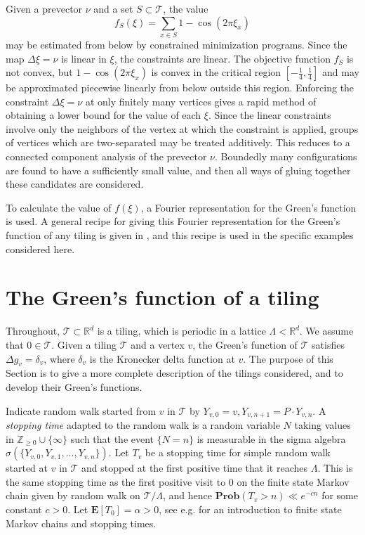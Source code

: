 \documentclass[a4paper, 12pt, notitlepage]{amsart}
\newcommand{\bR}{\mathbb{R}}
\newcommand{\zed}{\mathbb{Z}}
\newcommand{\E}{\mathbf{E}}
\newcommand{\Prob}{\mathbf{Prob}}
\newcommand{\sT}{\mathscr{T}}
\theoremstyle{remark}
\begin{document}
Given a prevector $\nu$ and a set $S\subset \sT$, the value
\[
 f_S(\xi) = \sum_{x \in S}1-\cos(2\pi \xi_x)
\]
may be estimated from below by constrained minimization programs.  Since the map $\Delta \xi = \nu$ is linear in $\xi$, the constraints are linear.  The objective function $f_S$ is not convex, but $1 - \cos(2\pi \xi_x)$ is convex in the critical region $\left[-\frac{1}{4}, \frac{1}{4}\right]$ and may be approximated piecewise linearly from below outside this region.  Enforcing the constraint $\Delta \xi = \nu$ at only finitely many vertices gives a rapid method of obtaining a lower bound for the value of each $\xi$.  Since the linear constraints involve only the neighbors of the vertex at which the constraint is applied, groups of vertices which are two-separated may be treated additively.  This reduces to a connected component analysis of the prevector $\nu$.  Boundedly many configurations are found to have a sufficiently small value, and then all ways of gluing together these candidates are considered.

To calculate the value of $f(\xi)$, a Fourier representation for the Green's function is used.  A general recipe for giving this Fourier representation for the Green's function of any tiling is given in \cite{HS19}, and this recipe is used in the specific examples considered here.


\section{The Green's function of a tiling}\label{Greens_function_section} 
Throughout, $\sT \subset \bR^d$ is a tiling, which is periodic in a lattice $\Lambda < \bR^d$.  We assume that $0 \in \sT$.
Given a tiling $\sT$ and a vertex $v$, the Green's function of $\sT$ satisfies $\Delta g_v = \delta_v$, where $\delta_v$ is the Kronecker delta function at $v$.  The purpose of this Section is to give a more complete description of the tilings considered, and to develop their Green's functions. 



Indicate random walk started from $v$ in $\sT$ by
$Y_{v,0} = v, Y_{v,n+1} = P \cdot Y_{v,n}$. A \emph{stopping time} adapted to the random walk is a random variable $N$ taking values in $\zed_{\geq 0} \cup \{\infty\}$ such that the event $\{N=n\}$ is measurable in the sigma algebra $\sigma(\{Y_{v,0}, Y_{v,1}, ..., Y_{v,n}\})$.  Let $T_v$ be a stopping time for simple random walk started at $v$ in $\sT$ and stopped at the first positive time that it reaches $\Lambda$.  This is the same stopping time as the first positive visit to 0 on the finite state Markov chain given by random walk on $\sT/\Lambda$, and hence $\Prob(T_v > n) \ll e^{-cn}$ for some constant $c > 0$.  Let $\E[T_0] = \alpha > 0$, see e.g. \cite{LPW17} for an introduction to finite state Markov chains and stopping times.
\end{document}
